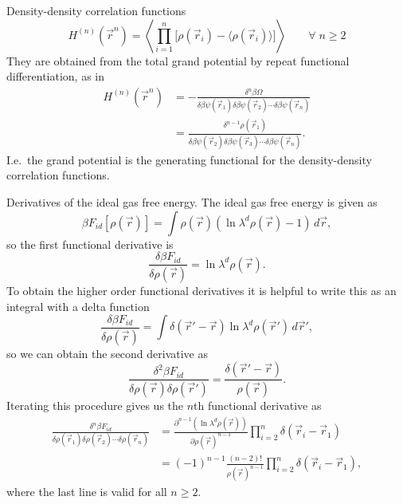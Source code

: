 \documentclass[12pt]{report}
\begin{document}
Density-density correlation functions
\begin{equation}
  H^{(n)}(\vec{r}^n) =
  \left\langle
  \prod_{i=1}^n
  \Big[ \rho(\vec{r}_i) - \big\langle\rho(\vec{r}_i)\big\rangle \Big]
  \right\rangle
  \qquad \forall \; n \ge 2
\end{equation}
They are obtained from the total grand potential by repeat functional differentiation, as in
\begin{equation}
  \begin{aligned}
  H^{(n)}(\vec{r}^n) &=
  - \frac{\delta^n \beta \Omega}{\delta \beta\psi(\vec{r}_1) \delta \beta\psi(\vec{r}_2) \cdots \delta \beta\psi(\vec{r}_n)} \\
  &=
  \frac{\delta^{n-1} \rho(\vec{r}_1)}{\delta \beta\psi(\vec{r}_2) \delta \beta\psi(\vec{r}_3) \cdots \delta \beta\psi(\vec{r}_n)}.
  \end{aligned}
\end{equation}
I.e.\ the grand potential is the generating functional for the density-density correlation functions.

Derivatives of the ideal gas free energy.
The ideal gas free energy is given as
\begin{equation*}
  \beta F_{id}[\rho(\vec{r})] =
  \int \rho(\vec{r}) (\ln{\lambda^d \rho(\vec{r})} - 1) \, d\vec{r},
\end{equation*}
so the first functional derivative is
\begin{equation*}
  \frac{\delta \beta F_{id}}{\delta \rho(\vec{r})} =
  \ln{\lambda^d \rho(\vec{r})}.
\end{equation*}
To obtain the higher order functional derivatives it is helpful to write this as an integral with a delta function
\begin{equation*}
  \frac{\delta \beta F_{id}}{\delta \rho(\vec{r})} =
  \int \delta{(\vec{r}' - \vec{r})}
  \ln{\lambda^d \rho(\vec{r}')} \, d\vec{r}',
\end{equation*}
so we can obtain the second derivative as
\begin{equation*}
  \frac{\delta^2 \beta F_{id}}{\delta \rho(\vec{r}) \delta \rho(\vec{r}')} =
  \frac{\delta(\vec{r}'-\vec{r})}{\rho(\vec{r})}.
\end{equation*}
Iterating this procedure gives us the $n$th functional derivative as
\begin{equation}
  \begin{aligned}
    \frac{\delta^n \beta F_{id}}{\delta \rho(\vec{r}_1) \delta \rho(\vec{r}_2) \cdots \delta \rho(\vec{r}_n)} &=
    \frac{\partial^{n-1} (\ln{\lambda^d \rho(\vec{r})})}{\partial \rho(\vec{r})^{n-1}}
    \prod_{i=2}^n \delta(\vec{r}_i - \vec{r}_1) \\
    &=
    (-1)^{n-1}
    \frac{(n-2)!}{\rho(\vec{r})^{n-1}}
    \prod_{i=2}^n \delta(\vec{r}_i - \vec{r}_1),
  \end{aligned}
\end{equation}
where the last line is valid for all $n \ge 2$.
\end{document}
